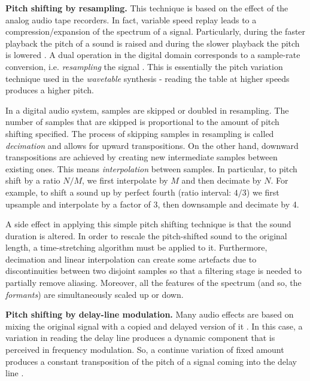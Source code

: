 \textbf{Pitch shifting by resampling.}
This technique is based on the effect of the analog audio tape recorders. In fact, variable speed replay leads to a compression/expansion of the spectrum of a signal. Particularly, during the faster playback the pitch of a sound is raised and during the slower playback the pitch is lowered \cite{zolder2011dafx}. A dual operation in the digital domain corresponds to a sample-rate conversion, i.e. \emph{resampling} the signal \cite{roads1996tutorial}. This is essentially the pitch variation technique used in the \emph{wavetable} synthesis - reading the table at higher speeds produces a higher pitch.  

In a digital audio system, samples are skipped or doubled in resampling. The number of samples that are skipped is proportional to the amount of pitch shifting specified. The process of skipping samples in resampling is called \emph{decimation} and allows for upward transpositions. On the other hand, downward transpositions are achieved by creating new intermediate samples between existing ones. This means \emph{interpolation} between samples. In particular, to pitch shift by a ratio $N/M$, we first interpolate by $M$ and then decimate by $N$. For example, to shift a sound up by perfect fourth (ratio interval: $4/3$) we first upsample and interpolate by a factor of 3, then downsample and decimate by 4.

A side effect in applying this simple pitch shifting technique is that the sound duration is altered. In order to rescale the pitch-shifted sound to the original length, a time-stretching algorithm must be applied to it. Furthermore, decimation and linear interpolation can create some artefacts due to discontinuities between two disjoint samples so that a filtering stage is needed to partially remove aliasing. Moreover, all the features of the spectrum (and so, the \emph{formants}) are simultaneously scaled up or down\cite{zolder2011dafx}.

\textbf{Pitch shifting by delay-line modulation.}
Many audio effects are based on mixing the original signal with a copied and delayed version of it \cite{disch1999modulation}. In this case, a variation in reading the delay line produces a dynamic component that is perceived in frequency modulation. So, a continue variation of fixed amount produces a constant transposition of the pitch of a signal coming into the delay line \cite{lazzarini2010audio}.

